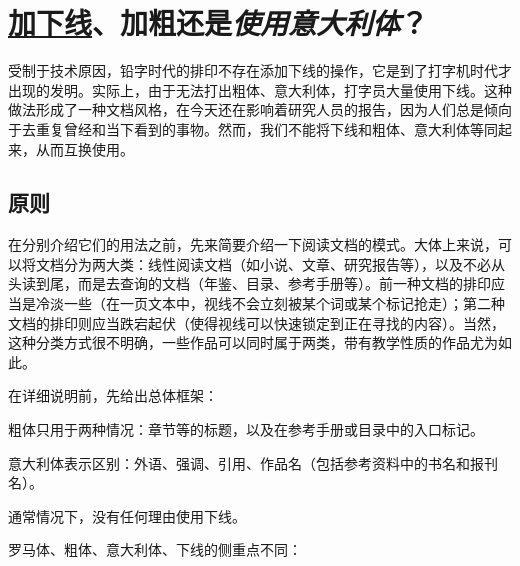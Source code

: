 \chapter{\textmd{\underline{加下线}、\textbf{加粗}还是\emph{使用意大利体}？}}

受制于技术原因，铅字时代的排印不存在添加下线的操作，它是到了打字机时代才出现的发明。实际上，由于无法打出粗体、意大利体，打字员大量使用下线。这种做法形成了一种文档风格，在今天还在影响着研究人员的报告，因为人们总是倾向于去重复曾经和当下看到的事物。然而，我们不能将下线和粗体、意大利体等同起来，从而互换使用。

\section{原则}

在分别介绍它们的用法之前，先来简要介绍一下阅读文档的模式。大体上来说，可以将文档分为两大类：线性阅读文档（如小说、文章、研究报告等），以及不必从头读到尾，而是去查询的文档（年鉴、目录、参考手册等）。前一种文档的排印应当是冷淡一些（在一页文本中，视线不会立刻被某个词或某个标记抢走）；第二种文档的排印则应当跌宕起伏（使得视线可以快速锁定到正在寻找的内容）。当然，这种分类方式很不明确，一些作品可以同时属于两类，带有教学性质的作品尤为如此。

在详细说明前，先给出总体框架：

\begin{mdframed}
    粗体只用于两种情况：章节等的标题，以及在参考手册或目录中的入口标记。

    \noindent 意大利体表示区别：外语、强调、引用、作品名（包括参考资料中的书名和报刊名）。

    \noindent 通常情况下，没有任何理由使用下线。
\end{mdframed}

罗马体、粗体、意大利体、下线的侧重点不同：

